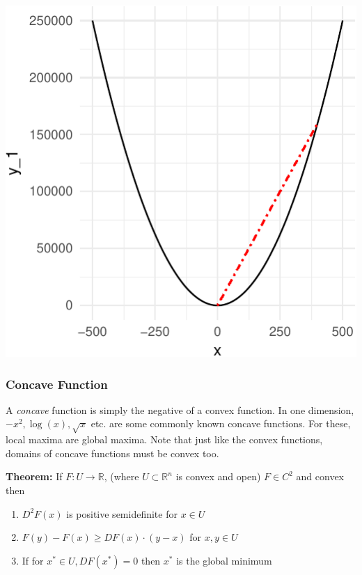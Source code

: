 \documentclass[11pt,]{article}
\providecommand{\tightlist}{%
  \setlength{\itemsep}{0pt}\setlength{\parskip}{0pt}}
\begin{document}
\includegraphics{Optimization_files/figure-latex/func_convex-1.pdf}

\subsubsection{Concave Function}\label{concave-function}

A \emph{concave} function is simply the negative of a convex function.
In one dimension, \(-x^2, \log(x), \sqrt{x}\) etc. are some commonly
known concave functions. For these, local maxima are global maxima. Note
that just like the convex functions, domains of concave functions must
be convex too.

\textbf{Theorem:} If \(F:U \to \mathbb{R}\), (where
\(U\subset \mathbb{R}^n\) is convex and open) \(F\in C^2\) and convex
then

\begin{enumerate}
\def\labelenumi{\arabic{enumi}.}
\tightlist
\item
  \(D^2F(x)\) is positive semidefinite for \(x\in U\)
\item
  \(F(y)-F(x)\geq DF(x)\cdot(y-x)\) for \(x, y\in U\)
\item
  If for \(x^*\in U, DF(x^*)=0\) then \(x^*\) is the global minimum
\end{enumerate}
\end{document}
